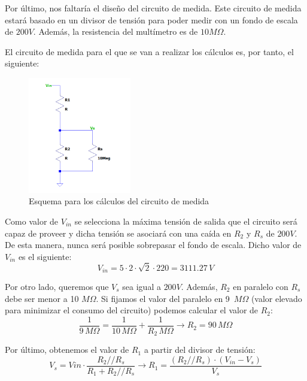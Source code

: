 Por último, nos faltaría el diseño del circuito de medida. Este circuito de medida estará basado en 
un divisor de tensión para poder medir con un fondo de escala de $200V$. Además, la resistencia 
del multímetro es de $10M\Omega$. 

El circuito de medida para el que se van a realizar los cálculos es, por tanto, el siguiente:
\begin{figure}[H]
    \centering
    \includegraphics[width=0.4\textwidth]{img/circ_medida.png}
    \caption{Esquema para los cálculos del circuito de medida}
    \label{fig:esquema_med}
\end{figure}

Como valor de $V_{in}$ se selecciona la máxima tensión de salida que el circuito será capaz de proveer y 
dicha tensión se asociará con una caída en $R_2$ y $R_s$ de $200V$. De esta manera, nunca será posible sobrepasar
el fondo de escala. Dicho valor de $V_{in}$ es el siguiente:
\begin{equation}
    V_{in} = 5\cdot2\cdot\sqrt{2}\cdot220 = 3111.27\,V
\end{equation}

Por otro lado, queremos que $V_s$ sea igual a $200V$. Además, $R_2$ en paralelo con $R_s$ debe 
ser menor a 10 $M\Omega$. Si fijamos el valor del paralelo en 9 $\,M\Omega$ (valor elevado para minimizar el consumo del circuito) podemos calcular 
el valor de $R_2$:
\begin{equation}
    \frac{1}{9\,M\Omega} = \frac{1}{10\,M\Omega} +\frac{1}{R_2\,M\Omega} \rightarrow R_2 = 90\,M\Omega
\end{equation}

Por último, obtenemos el valor de $R_1$ a partir del divisor de tensión:
\begin{equation}
    V_s = Vin\cdot\frac{R_2//R_s}{R_1+R_2//R_s} \rightarrow R_1 = \frac{(R_2//R_s)\cdot(V_{in}-V_s)}{V_s}
\end{equation}

